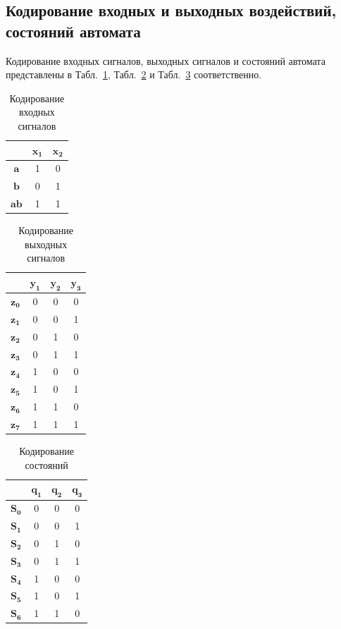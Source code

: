 \documentclass[a4paper, final]{article}
\begin{document}
\subsection{Кодирование входных и выходных воздействий, состояний автомата}
Кодирование входных сигналов, выходных сигналов и состояний автомата представлены в Табл.~\ref{tbl:code_input}, Табл.~\ref{tbl:code_output} и Табл.~\ref{tbl:code_states} соответственно.

\begin{table}[h!]
  \centering
  \caption{Кодирование входных сигналов}
  \label{tbl:code_input}
  \footnotesize
  \begin{tabular}{|c|c|c|}
  \hline
        & $\mathbf{x_1}$& $\mathbf{x_2}$ \\
  \hline
  $\mathbf{a}$ & 1 & 0 \\
  \hline
  $\mathbf{b}$ & 0 & 1 \\
  \hline
  $\mathbf{ab}$ & 1 & 1 \\
  \hline
  \end{tabular}
\end{table}

\begin{table}[h!]
  \centering
  \caption{Кодирование выходных сигналов}
  \label{tbl:code_output}
\begin{tabular}{|c|c|c|c|}
  \hline
        & $\mathbf{y_1}$& $\mathbf{y_2}$ & $\mathbf{y_3}$  \\
  \hline
  $\mathbf{z_0}$ & 0 & 0 & 0 \\
  \hline
  $\mathbf{z_1}$ & 0 & 0 & 1 \\
  \hline
  $\mathbf{z_2}$ & 0 & 1 & 0 \\
  \hline
  $\mathbf{z_3}$ & 0 & 1 & 1 \\
  \hline
  $\mathbf{z_4}$ & 1 & 0 & 0 \\
  \hline
  $\mathbf{z_5}$ & 1 & 0 & 1 \\
  \hline
  $\mathbf{z_6}$ & 1 & 1 & 0 \\
  \hline
  $\mathbf{z_7}$ & 1 & 1 & 1 \\
  \hline
  \end{tabular}
\end{table}

\begin{table}[h!]
  \centering
  \caption{Кодирование состояний}
  \label{tbl:code_states}
  \footnotesize
  \begin{tabular}{|c|c|c|c|}
  \hline
        & $\mathbf{q_1}$& $\mathbf{q_2}$ & $\mathbf{q_3}$  \\
  \hline
  $\mathbf{S_0}$ & 0 & 0 & 0 \\
  \hline
  $\mathbf{S_1}$ & 0 & 0 & 1 \\
  \hline
  $\mathbf{S_2}$ & 0 & 1 & 0 \\
  \hline
  $\mathbf{S_3}$ & 0 & 1 & 1 \\
  \hline
  $\mathbf{S_4}$ & 1 & 0 & 0 \\
  \hline
  $\mathbf{S_5}$ & 1 & 0 & 1 \\
  \hline
  $\mathbf{S_6}$ & 1 & 1 & 0 \\
  \hline
  \end{tabular}
\end{table}
\end{document}
